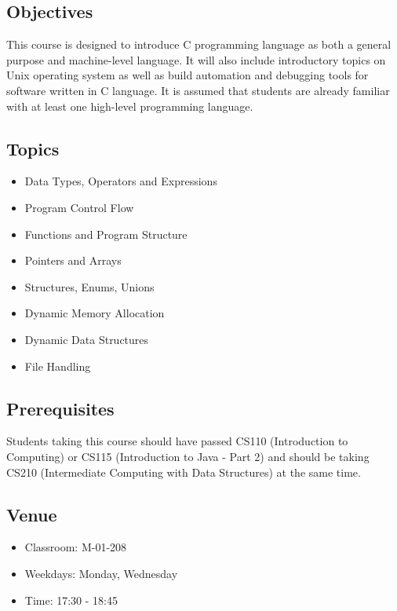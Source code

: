 \documentclass[12pt,letterpaper,twoside]{article}
\begin{document}


\subsection*{Objectives}
This course is designed to introduce C programming language as both a general purpose and machine-level language.
It will also include introductory topics on Unix operating system as well as build automation and debugging tools for software written in C language.
It is assumed that students are already familiar with at least one high-level programming language.

\subsection*{Topics}
\begin{itemize}
\item[] Data Types, Operators and Expressions
\item[] Program Control Flow
\item[] Functions and Program Structure
\item[] Pointers and Arrays
\item[] Structures, Enums, Unions
\item[] Dynamic Memory Allocation
\item[] Dynamic Data Structures
\item[] File Handling
\end{itemize}

\subsection*{Prerequisites}
Students taking this course should have passed CS110 (Introduction to Computing) or CS115 (Introduction to Java - Part 2) and should be taking CS210 (Intermediate Computing with Data Structures) at the same time.

\subsection*{Venue}
\begin{itemize}
\item[] Classroom: M-01-208
\item[] Weekdays: Monday, Wednesday
\item[] Time: 17:30 - 18:45
\end{itemize}
\end{document}
